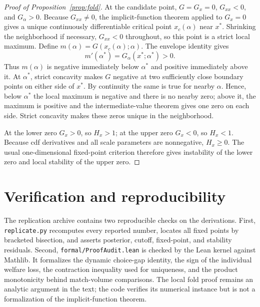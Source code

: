 \documentclass[11pt]{article}
\begin{document}
\begin{proof}[Proof of Proposition~\ref{prop:fold}]
At the candidate point, $G=G_x=0$, $G_{xx}<0$, and $G_\alpha>0$. Because
$G_{xx}\neq0$, the implicit-function theorem applied to $G_x=0$ gives a unique
continuously differentiable critical point $x_c(\alpha)$ near $x^*$.
Shrinking the neighborhood if necessary, $G_{xx}<0$ throughout, so this point
is a strict local maximum. Define $m(\alpha)=G(x_c(\alpha);\alpha)$. The envelope
identity gives
\[
m'(\alpha^*)=G_\alpha(x^*;\alpha^*)>0.
\]
Thus $m(\alpha)$ is negative immediately below $\alpha^*$ and positive
immediately above it. At $\alpha^*$, strict concavity makes $G$ negative at two
sufficiently close boundary points on either side of $x^*$. By continuity the
same is true for nearby $\alpha$. Hence, below $\alpha^*$ the local maximum is
negative and there is no nearby zero; above it, the maximum is positive and the
intermediate-value theorem gives one zero on each side. Strict concavity makes
these zeros unique in the neighborhood.

At the lower zero $G_x>0$, so $H_x>1$; at the upper zero $G_x<0$, so $H_x<1$.
Because cdf derivatives and all scale parameters are nonnegative, $H_x\geq0$.
The usual one-dimensional fixed-point criterion therefore gives instability of
the lower zero and local stability of the upper zero.
\end{proof}

\section{Verification and reproducibility}\label{sec:verification}

The replication archive contains two reproducible checks on the derivations.
First, \texttt{replicate.py} recomputes every reported number, locates all fixed
points by bracketed bisection, and asserts posterior, cutoff, fixed-point, and
stability residuals. Second, \texttt{formal/ProofAudit.lean} is checked by the
Lean kernel against Mathlib. It formalizes the dynamic choice-gap identity, the
sign of the individual welfare loss, the contraction inequality used for
uniqueness, and the product monotonicity behind match-volume comparisons. The
local fold proof remains an analytic argument in the text; the code verifies
its numerical instance but is not a formalization of the implicit-function
theorem.



\end{document}
